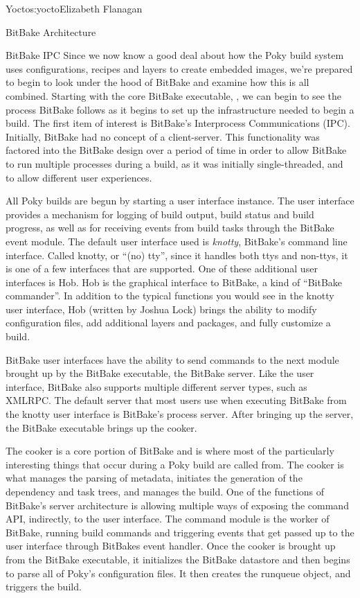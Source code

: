 \begin{aosachapter}{Yocto}{s:yocto}{Elizabeth Flanagan}
\begin{aosasect1}{BitBake Architecture}
\begin{aosasect2}{BitBake IPC}
Since we now know a good deal about how the Poky build system uses
configurations, recipes and layers to create embedded images, we're
prepared to begin to look under the hood of BitBake and examine how
this is all combined. Starting with the core BitBake executable,
, we can begin to see the process BitBake follows as it
begins to set up the infrastructure needed to begin a build. The first
item of interest is BitBake's Interprocess Communications
(IPC). Initially, BitBake had no concept of a
client-server. This functionality was factored into the BitBake design
over a period of time in order to allow BitBake to run multiple
processes during a build, as it was initially single-threaded, and to
allow different user experiences.


All Poky builds are begun by starting a user interface instance. The
user interface provides a mechanism for logging of build output, build
status and build progress, as well as for receiving events from build tasks
through the BitBake event module.  The default user interface used is
\emph{knotty}, BitBake's command line interface. Called knotty, or ``(no)
tty'', since it handles both ttys and non-ttys, it is one of a few
interfaces that are supported.  One of these additional user
interfaces is Hob. Hob is the graphical interface to BitBake, a kind
of ``BitBake commander''. In addition to the typical functions you
would see in the knotty user interface, Hob (written by Joshua Lock)
brings the ability to modify configuration files, add additional
layers and packages, and fully customize a build.

BitBake user interfaces have the ability to send commands to the next
module brought up by the BitBake executable, the BitBake server. Like
the user interface, BitBake also supports multiple different server
types, such as XMLRPC. The default server that most users use
when executing BitBake from the knotty user interface is BitBake's
process server. After bringing up the server, the BitBake executable
brings up the cooker.

The cooker is a core portion of BitBake and is where most of the
particularly interesting things that occur during a Poky build are
called from. The cooker is what manages the parsing of metadata,
initiates the generation of the dependency and task trees, and manages
the build. One of the functions of BitBake's server architecture is
allowing multiple ways of exposing the command API, indirectly, to the
user interface. The command module is the worker of BitBake, running
build commands and triggering events that get passed up to the user
interface through BitBakes event handler.  Once the cooker is brought
up from the BitBake executable, it initializes the BitBake datastore
and then begins to parse all of Poky's configuration files. It then
creates the runqueue object, and triggers the build.


\end{aosasect2}
\end{aosasect1}
\end{aosachapter}
